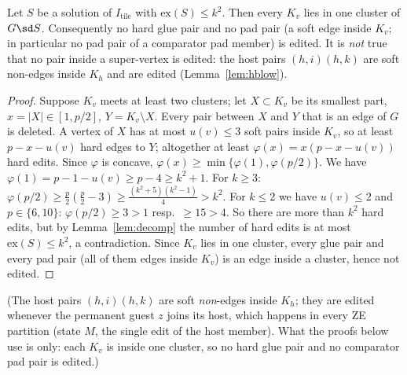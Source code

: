 \begin{lemma}\label{lem:hsplit}
Let $S$ be a solution of $I_{\mathrm{tile}}$ with $\mathrm{ex}(S)\le k^2$. Then every $K_v$ lies in one cluster of $G\sd S$. Consequently no hard glue pair and no pad pair (a soft edge inside $K_v$; in particular no pad pair of a comparator pad member) is edited. It is \emph{not} true that no pair inside a super-vertex is edited: the host pairs $(h,i)(h,k)$ are soft non-edges inside $K_h$ and are edited (Lemma~\ref{lem:hblow}).
\end{lemma}
\begin{proof}
Suppose $K_v$ meets at least two clusters; let $X\subset K_v$ be its smallest part, $x=|X|\in[1,p/2]$, $Y=K_v\setminus X$. Every pair between $X$ and $Y$ that is an edge of $G$ is deleted. A vertex of $X$ has at most $u(v)\le3$ soft pairs inside $K_v$, so at least $p-x-u(v)$ hard edges to $Y$; altogether at least $\varphi(x)=x(p-x-u(v))$ hard edits. Since $\varphi$ is concave, $\varphi(x)\ge\min\{\varphi(1),\varphi(p/2)\}$. We have $\varphi(1)=p-1-u(v)\ge p-4\ge k^2+1$. For $k\ge3$: $\varphi(p/2)\ge\frac p2(\frac p2-3)\ge\frac{(k^2+5)(k^2-1)}4>k^2$. For $k\le2$ we have $u(v)\le2$ and $p\in\{6,10\}$: $\varphi(p/2)\ge3>1$ resp.\ $\ge15>4$. So there are more than $k^2$ hard edits, but by Lemma~\ref{lem:decomp} the number of hard edits is at most $\mathrm{ex}(S)\le k^2$, a contradiction. Since $K_v$ lies in one cluster, every glue pair and every pad pair (all of them edges inside $K_v$) is an edge inside a cluster, hence not edited.
\end{proof}
(The host pairs $(h,i)(h,k)$ are soft \emph{non}-edges inside $K_h$; they are edited whenever the permanent guest $z$ joins its host, which happens in every ZE partition (state $M$, the single edit of the host member). What the proofs below use is only: each $K_v$ is inside one cluster, so no hard glue pair and no comparator pad pair is edited.)

